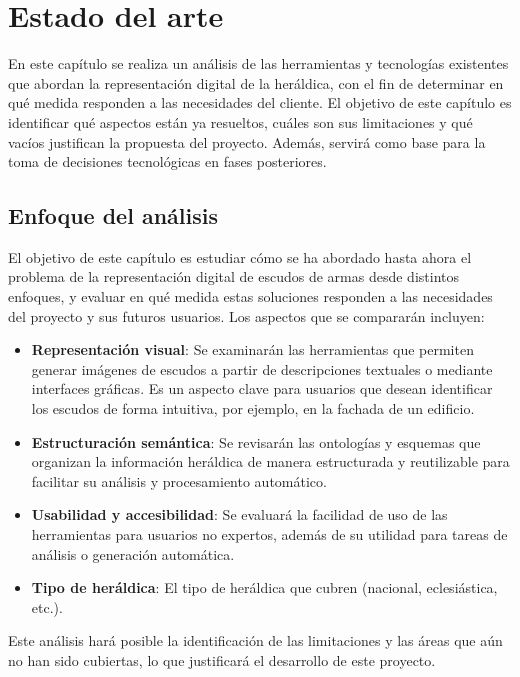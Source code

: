 \chapter{Estado del arte}

En este capítulo se realiza un análisis de las herramientas y tecnologías
existentes que abordan la representación digital de la heráldica, con el fin
de determinar en qué medida responden a las necesidades del cliente.
El objetivo de este capítulo es identificar qué aspectos están ya resueltos,
cuáles son sus limitaciones y qué vacíos justifican la propuesta del proyecto.
Además, servirá como base para la toma de decisiones tecnológicas en fases posteriores.

\section{Enfoque del análisis}
El objetivo de este capítulo es estudiar cómo se ha abordado hasta ahora el problema de 
la representación digital de escudos de armas desde distintos enfoques, y evaluar en qué 
medida estas soluciones responden a las necesidades del proyecto y sus futuros usuarios.
Los aspectos que se compararán incluyen:

\begin{itemize}
    \item \textbf{Representación visual}: Se examinarán las herramientas que permiten
    generar imágenes de escudos a partir de descripciones textuales o mediante interfaces 
    gráficas. Es un aspecto clave para usuarios que desean identificar los escudos de
    forma intuitiva, por ejemplo, en la fachada de un edificio.
    \item \textbf{Estructuración semántica}: Se revisarán las ontologías y esquemas que
    organizan la información heráldica de manera estructurada y reutilizable para facilitar
    su análisis y procesamiento automático.
    \item \textbf{Usabilidad y accesibilidad}: Se evaluará la facilidad de uso de las herramientas
    para usuarios no expertos, además de su utilidad para tareas de análisis o generación automática.
    \item \textbf{Tipo de heráldica}: El tipo de heráldica que cubren (nacional, eclesiástica, etc.).
\end{itemize}

Este análisis hará posible la identificación de las limitaciones y las áreas que aún no han sido
cubiertas, lo que justificará el desarrollo de este proyecto.

